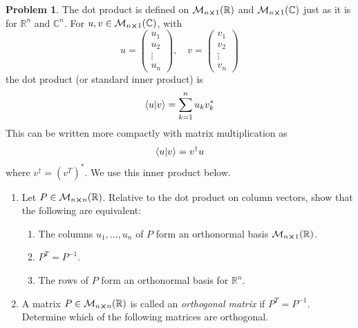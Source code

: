 \documentclass[10pt]{article}
\theoremstyle{definition}
\newtheorem{problem}{Problem}
\begin{document}
\begin{problem}
The dot product is defined on $\mathcal{M}_{n\cross 1}(\mathbb{R})$ and $\mathcal{M}_{n\cross 1}(\mathbb{C})$ just as it is
for $\mathbb{R}^n$ and $\mathbb{C}^n$. For $u,v\in\mathcal{M}_{n\cross 1}(\mathbb{C})$, with
$$u=\begin{pmatrix}
    u_1    \\
    u_2    \\
    \vdots \\
    u_n
  \end{pmatrix},\quad v=\begin{pmatrix}
    v_1    \\
    v_2    \\
    \vdots \\
    v_n
  \end{pmatrix}$$
the dot product (or standard inner product) is
$$\braket{u}{v}=\sum_{k=1}^{n}u_kv_k^*$$
This can be written more compactly with matrix multiplication as
$$\braket{u}{v}=v^\dagger u$$
where $v^\dagger=\left(v^T\right)^*$. We use this inner product below.
\begin{enumerate}[label=(\alph*)]
  \item Let $P\in\mathcal{M}_{n\cross n}(\mathbb{R})$. Relative to the dot product on column vectors, show that the following are equivalent:
        \begin{enumerate}[label=(\roman*)]
          \item The columns $u_1,\dots,u_n$ of $P$ form an orthonormal basis $\mathcal{M}_{n\cross 1}(\mathbb{R})$.
          \item $P^T=P^{-1}$.
          \item The rows of $P$ form an orthonormal basis for $\mathbb{R}^n$.
        \end{enumerate}
  \item A matrix $P\in\mathcal{M}_{n\cross n}(\mathbb{R})$ is called an \emph{orthogonal matrix} if $P^T=P^{-1}$. Determine which
        of the following matrices are orthogonal.
\end{enumerate}
\end{problem}
\end{document}
